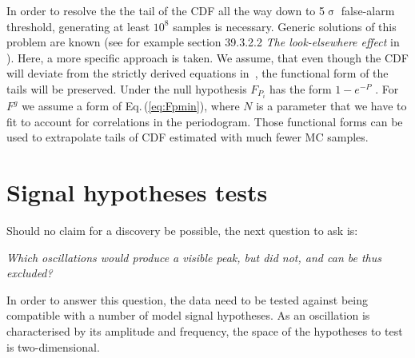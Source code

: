 In order to resolve the the tail of the CDF all the way down to 5$\upsigma$ false-alarm threshold, generating at least $10^8$ samples is necessary. Generic solutions of this problem are known (see for example section 39.3.2.2 \emph{The look-elsewhere effect} in \cite{PDG2016}). Here, a more specific approach is taken. We assume, that even though the CDF will deviate from the strictly derived equations in~\cite{Scargle1982}, the functional form of the tails will be preserved. Under the null hypothesis $F_{P_i}$ has the form $1 - e^{-P}$ \cite{Scargle1982}. For $F^g$ we assume a form of Eq.\,(\ref{eq:Fpmin}), where $N$ is a parameter that we have to fit to account for correlations in the periodogram. Those functional forms can be used to extrapolate tails of CDF estimated with much fewer MC samples.


%





\section{Signal hypotheses tests}
Should no claim for a discovery be possible, the next question to ask is:
\begin{center}
  \emph{Which oscillations would produce a visible peak, but did not, and can be thus excluded?}
\end{center}
In order to answer this question, the data need to be tested against being compatible with a number of model signal hypotheses. As an oscillation is characterised by its amplitude and frequency, the space of the hypotheses to test is two-dimensional.

